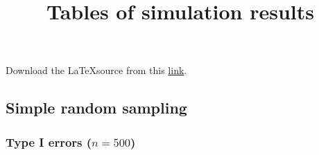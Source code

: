 \documentclass[
]{article}
\title{Tables of simulation results}
\author{}
\date{\vspace{-2.5em}}
\begin{document}
\maketitle

{
\setcounter{tocdepth}{3}
\tableofcontents
}
Download the \LaTeX source from this
\href{https://raw.githubusercontent.com/haziqj/lavaan.bingof/gh-pages/articles/sim_tables.tex}{link}.

\subsection{Simple random sampling}\label{simple-random-sampling}

\subsubsection{\texorpdfstring{Type I errors
(\(n=500\))}{Type I errors (n=500)}}\label{type-i-errors-n500}
\end{document}
